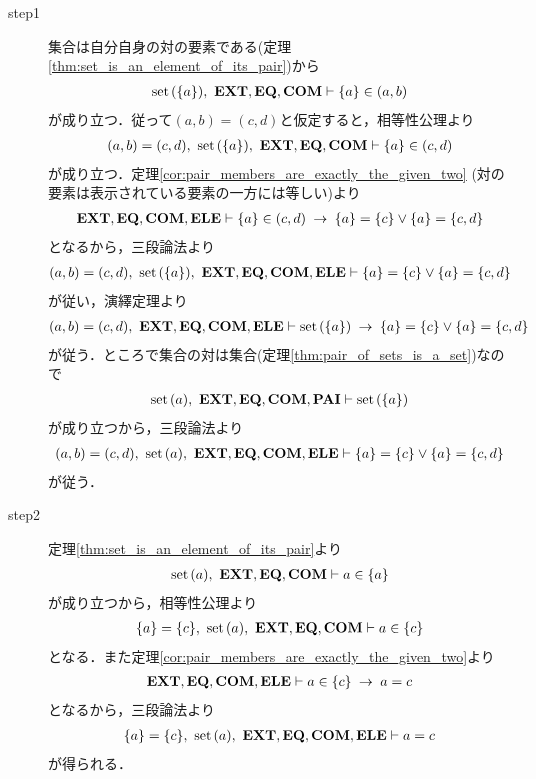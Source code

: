 	\begin{sketch}\mbox{}
		\begin{description}
			\item[step1] 集合は自分自身の対の要素である(定理\ref{thm:set_is_an_element_of_its_pair})から
				\begin{align}
					\operatorname*{set}\hspace{0.15em}(\{a\}),\ \mbox{{\bf EXT}},\mbox{{\bf EQ}},\mbox{\bf COM} \vdash \{a\} \in (a,b)
				\end{align}
				が成り立つ．従って$(a,b) = (c,d)$と仮定すると，相等性公理より
				\begin{align}
					(a,b) = (c,d),\ \operatorname*{set}\hspace{0.15em}(\{a\}),\ \mbox{{\bf EXT}},\mbox{{\bf EQ}},\mbox{\bf COM} \vdash \{a\} \in (c,d)
				\end{align}
				が成り立つ．定理\ref{cor:pair_members_are_exactly_the_given_two}
				(対の要素は表示されている要素の一方には等しい)より
				\begin{align}
					\mbox{{\bf EXT}},\mbox{{\bf EQ}},\mbox{\bf COM},\mbox{{\bf ELE}} \vdash \{a\} \in (c,d) \hspace{0.25em}\rightarrow\hspace{0.25em} \{a\} = \{c\} \vee \{a\} = \{c,d\}
					\label{fom:equality_of_ordered_pairs_1}
				\end{align}
				となるから，三段論法より
				\begin{align}
					(a,b) = (c,d),\ \set{\{a\}},\ \EXTAX,\EQAX,\COMAX,\ELEAX \vdash \{a\} = \{c\} \vee \{a\} = \{c,d\}
				\end{align}
				が従い，演繹定理より
				\begin{align}
					(a,b) = (c,d),\ \mbox{{\bf EXT}},\mbox{{\bf EQ}},\mbox{\bf COM},\mbox{{\bf ELE}} \vdash
					\operatorname*{set}\hspace{0.15em}(\{a\}) \hspace{0.25em}\rightarrow\hspace{0.25em} \{a\} = \{c\} \vee \{a\} = \{c,d\}
				\end{align}
				が従う．ところで集合の対は集合(定理\ref{thm:pair_of_sets_is_a_set})なので
				\begin{align}
					\operatorname*{set}\hspace{0.15em}(a),\ \mbox{{\bf EXT}},\mbox{{\bf EQ}},\mbox{\bf COM},\mbox{{\bf PAI}} \vdash \operatorname*{set}\hspace{0.15em}(\{a\})
				\end{align}
				が成り立つから，三段論法より
				\begin{align}
					(a,b) = (c,d),\ \operatorname*{set}\hspace{0.15em}(a),\ \mbox{{\bf EXT}},\mbox{{\bf EQ}},\mbox{\bf COM},\mbox{{\bf ELE}} \vdash \{a\} = \{c\} \vee \{a\} = \{c,d\}
					\label{fom:equality_of_ordered_pairs_2}
				\end{align}
				が従う．
		
		
			\item[step2] 定理\ref{thm:set_is_an_element_of_its_pair}より
				\begin{align}
					\operatorname*{set}\hspace{0.15em}(a),\ \mbox{{\bf EXT}},\mbox{{\bf EQ}},\mbox{\bf COM} \vdash a \in \{a\}
				\end{align}
				が成り立つから，相等性公理より
				\begin{align}
					\{a\} = \{c\},\ \operatorname*{set}\hspace{0.15em}(a),\ \mbox{{\bf EXT}},\mbox{{\bf EQ}},\mbox{\bf COM} \vdash a \in \{c\}
				\end{align}
				となる．また定理\ref{cor:pair_members_are_exactly_the_given_two}より
				\begin{align}
					\mbox{{\bf EXT}},\mbox{{\bf EQ}},\mbox{\bf COM},\mbox{{\bf ELE}} \vdash a \in \{c\} \hspace{0.25em}\rightarrow\hspace{0.25em} a = c
				\end{align}
				となるから，三段論法より
				\begin{align}
					\{a\} = \{c\},\ \operatorname*{set}\hspace{0.15em}(a),\ \mbox{{\bf EXT}},\mbox{{\bf EQ}},\mbox{\bf COM},\mbox{{\bf ELE}} \vdash a = c
					\label{fom:equality_of_ordered_pairs_3}
				\end{align}
				が得られる．
				

\end{description}
\end{sketch}
